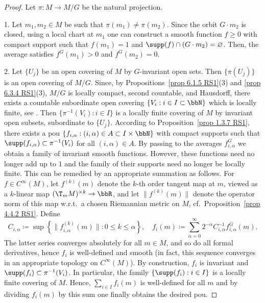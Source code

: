 \begin{proof}
    Let $\pi: M\to M\slash G$ be the natural projection.

    1. Let $m_1,m_2\in M$ be such that $\pi(m_1)\neq \pi(m_2)$. Since the orbit $G\cdot m_2$ is closed, using a local chart at $m_1$ one can construct a smooth function $f\geq 0$ with compact support such that $f(m_1)=1$ and $\supp(f)\cap (G\cdot m_2)=\varnothing$. Then, the average satisfies $f^G(m_1)>0$ and $f^G(m_2)=0$.

    2. Let $\{U_j\}$ be an open covering of $M$ by $G$-invariant open sets. Then $\{\pi(U_j)\}$ is an open covering of $M\slash G$. Since, by Propositions~\ref{prop 6.1.5 RS1}(3) and \ref{prop 6.3.4 RS1}(3), $M\slash G$ is locally compact, second countable, and Hausdorff, there exists a countable subordinate open covering $\{V_i:i\in I\subset \bbN\}$ which is locally finite, see \cite[Lem.~1.9]{Warner}. Then $\{\pi^{-1}(V_i):i\in I\}$ is a locally finite covering of $M$ by invariant open subsets, subordinate to $\{U_j\}$. According to Proposition~\ref{prop 1.3.7 RS1}, there exists a \gls{pou} $\{f_{i,\alpha}:(i,\alpha)\in A\subset I\times\bbN\}$ with compact supports such that $\supp(f_{i,\alpha})\subset \pi^{-1}(V_i)$ for all $(i,\alpha)\in A$. By passing to the averages $f_{i,\alpha}^G$ we obtain a family of invariant smooth functions. However, these functions need no longer add up to $1$ and the family of their supports need no longer be locally finite. This can be remedied by an appropriate summation as follows. For $f\in C^\infty(M)$, let $f^{(k)}(m)$ denote the $k$-th order tangent map at $m$, viewed as a $k$-linear map $(\T_m M)^{\times k}\to \bbR$, and let $\lVert f^{(k)}(m)\rVert$ denote the operator norm of this map w.r.t.\ a chosen Riemannian metric on $M$, cf.\ Proposition~\ref{prop 4.4.2 RS1}. Define 
    \[C_{i,\alpha}\coloneqq \sup\left\{\lVert f_{i,\alpha}^{(k)}(m)\rVert:0\leq k\leq \alpha\right\},\quad f_i(m)\coloneqq \sum_{\alpha=0}^\infty 2^{-\alpha}C_{i,\alpha}^{-1}f_{i,\alpha}^G(m).\]
    The latter series converges absolutely for all $m\in M$, and so do all formal derivatives, hence $f_i$ is well-defined and smooth (in fact, this sequence converges in an appropriate topology on $C^\infty(M)$). By construction, $f_i$ is invariant and $\supp(f_i)\subset\pi^{-1}(V_i)$. In particular, the family $\{\supp(f_i):i\in I\}$ is a locally finite covering of $M$. Hence, $\sum_{i\in I}f_i(m)$ is well-defined for all $m$ and by dividing $f_i(m)$ by this sum one finally obtains the desired \gls{pou}.


\end{proof}
